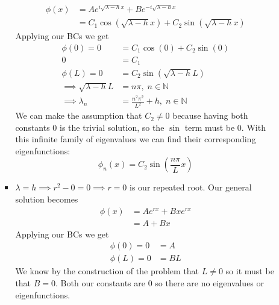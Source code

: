 \documentclass[12pt]{article}
\numberwithin{equation}{section}
\numberwithin{figure}{section}
\begin{document}
\begin{enumerate}
\begin{enumerate}
\begin{itemize}
\begin{align*}
                    \phi(x)&=Ae^{i\sqrt{\lambda-h}x}+Be^{-i\sqrt{\lambda-h}x}\\
                    &=C_1\cos(\sqrt{\lambda-h}x)+C_2\sin(\sqrt{\lambda-h}x)
                \end{align*}
                Applying our BCs we get 
                \begin{align*}
                    \phi(0)=0&=C_1\cos(0)+C_2\sin(0)\\
                    0&=C_1\\
                    \phi(L)=0&=C_2\sin(\sqrt{\lambda-h}L)\\
                    \implies \sqrt{\lambda-h}L&=n\pi,\; n\in\mathbb{N} \\
                    \implies \lambda_n&=\frac{n^2\pi^2}{L^2}+h,\; n\in\mathbb{N}
                \end{align*}
                We can make the assumption that $C_2\neq 0$ because having both constants 0 is the trivial solution, 
                so the $\sin$ term must be 0. With this infinite family of eigenvalues we can find their corresponding 
                eigenfunctions:
                \begin{equation*}
                    \phi_n(x)=C_2\sin(\frac{n\pi}{L}x)
                \end{equation*}

                \item $\lambda=h \implies r^2-0=0 \implies r=0$ is our repeated root. Our general solution becomes 
                \begin{align*}
                    \phi(x)&=Ae^{rx}+Bxe^{rx}\\
                    &=A+Bx
                \end{align*}
                Applying our BCs we get 
                \begin{align*}
                    \phi(0)=0&=A\\
                    \phi(L)=0&=BL
                \end{align*}
                We know by the construction of the problem that $L\neq0$ so it must be that $B=0$. Both our constants 
                are 0 so there are no eigenvalues or eigenfunctions.


\end{itemize}
\end{enumerate}
\end{enumerate}
\end{document}
